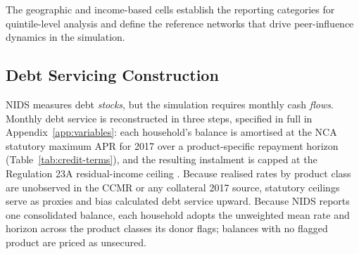 The geographic and income-based cells establish the reporting categories for quintile-level analysis and define the reference networks that drive peer-influence dynamics in the simulation.

\subsection{Debt Servicing Construction}
\label{sec:servicing}

\ac{NIDS} measures debt \emph{stocks}, but the simulation requires monthly cash \emph{flows}.
Monthly debt service is reconstructed in three steps, specified in full in Appendix~\ref{app:variables}: each household's balance is amortised at the \ac{NCA} statutory maximum \ac{APR} for 2017 \cite{sa_ncr_ratecaps_2016} over a product-specific repayment horizon (Table~\ref{tab:credit-terms}), and the resulting instalment is capped at the Regulation 23A residual-income ceiling \cite{sa_ncr_affordability_2015}.
Because realised rates by product class are unobserved in the \ac{CCMR} \cite{ncr_ccmr_2017} or any collateral 2017 source, statutory ceilings serve as proxies and bias calculated debt service upward.
Because \ac{NIDS} reports one consolidated balance, each household adopts the unweighted mean rate and horizon across the product classes its donor flags; balances with no flagged product are priced as unsecured.

